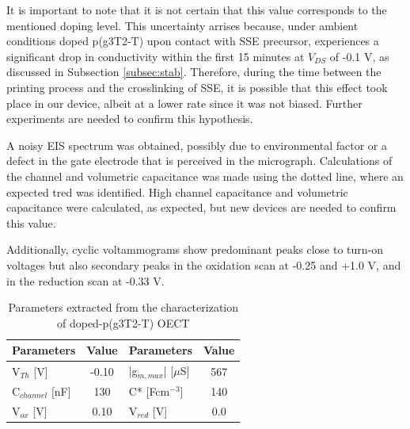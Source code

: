 It is important to note that it is not certain that this value corresponds to the mentioned doping level. This uncertainty arrises because, under ambient conditions doped p(g3T2-T) upon contact with SSE precursor, experiences a significant drop in conductivity within the first 15 minutes at $V_{DS}$ of -0.1 V, as discussed in Subsection \ref{subsec:stab}. Therefore, during the time between the printing process and the crosslinking of SSE, it is possible that this effect took place in our device, albeit at a lower rate since it was not biased. Further experiments are needed to confirm this hypothesis.

A noisy EIS spectrum was obtained, possibly due to environmental factor or a defect in the gate electrode that is perceived in the micrograph. Calculations of the channel and volumetric capacitance was made using the dotted line, where an expected tred was identified. High channel capacitance and volumetric capacitance were calculated, as expected, but new devices are needed to confirm this value.  %

Additionally, cyclic voltammograms show predominant peaks close to turn-on voltages but also secondary peaks in the oxidation scan at -0.25 and +1.0 V, and in the reduction scan at -0.33 V. 

\begin{table}[ht]
\centering
\caption{Parameters extracted from the characterization of doped-p(g3T2-T) OECT}
\begin{tabular}{l|c||l|c}
Parameters & Value & Parameters & Value \\\hline \hline
V$_{Th}$ [V] & -0.10 & |g$_{m,max}$| [$\mu$S] & 567 \\
C$_{channel}$ [nF] & 130 & C* [Fcm$^{-3}$] &  140 \\
V$_{ox}$ [V] & 0.10 & V$_{red}$ [V] & 0.0 \\\hline
\end{tabular}
\label{tab:dopedfom}
\end{table}



